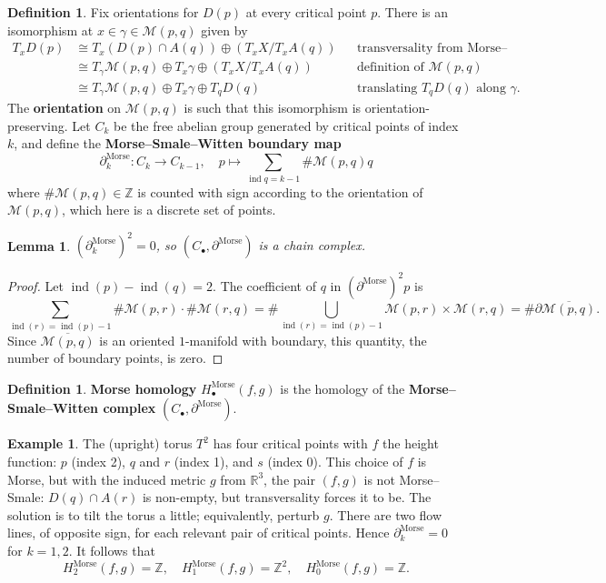 \documentclass{report}
\theoremstyle{plain}
\newtheorem{lemma}[theorem]{Lemma}
\theoremstyle{definition}
\newtheorem{definition}[theorem]{Definition}
\newtheorem{example}[theorem]{Example}
\theoremstyle{remark}
\newcommand{\di}{\partial}
\newcommand{\bR}{\mathbb{R}}
\newcommand{\bZ}{\mathbb{Z}}
\newcommand{\cM}{\mathcal{M}}
\newcommand{\Morse}{\mathrm{Morse}}
\DeclareMathOperator{\ind}{ind}
\begin{document}
\begin{definition}
  Fix orientations for $D(p)$ at every critical point $p$. There is an
  isomorphism at $x \in \gamma \in \cM(p, q)$ given by
  \begin{align*}
    T_xD(p) &\cong T_x(D(p) \cap A(q)) \oplus (T_xX/T_xA(q)) && \text{transversality from Morse--Smale} \\
    &\cong T_\gamma \cM(p, q) \oplus T_x\gamma \oplus (T_xX/T_xA(q)) && \text{definition of $\cM(p, q)$} \\
    &\cong T_\gamma \cM(p, q) \oplus T_x\gamma \oplus T_qD(q) && \text{translating $T_qD(q)$ along $\gamma$.}
  \end{align*}
  The {\bf orientation} on $\cM(p, q)$ is such that this isomorphism
  is orientation-preserving. Let $C_k$ be the free abelian group
  generated by critical points of index $k$, and define the {\bf
    Morse--Smale--Witten boundary map}
  \[ \di_k^{\Morse}\colon C_k \to C_{k-1}, \quad p \mapsto \sum_{\ind q = k-1} \# \cM(p, q) q \]
  where $\# \cM(p, q) \in \bZ$ is counted with sign according to the
  orientation of $\cM(p, q)$, which here is a discrete set of points.
\end{definition}

\begin{lemma}
  $(\di_k^\Morse)^2 = 0$, so $(C_\bullet, \di^\Morse)$ is a chain
  complex.
\end{lemma}

\begin{proof}
  Let $\ind(p) - \ind(q) = 2$. The coefficient of $q$ in
  $(\di^\Morse)^2p$ is
  \[ \sum_{\ind(r) = \ind(p)-1} \# \cM(p, r) \cdot \# \cM(r, q) = \# \bigcup_{\ind(r) = \ind(p)-1} \cM(p, r) \times \cM(r, q) = \# \di \overline{\cM(p, q)}. \]
  Since $\overline{\cM(p, q)}$ is an oriented $1$-manifold with
  boundary, this quantity, the number of boundary points, is
  zero.
\end{proof}

\begin{definition}
  {\bf Morse homology} $H_\bullet^\Morse(f, g)$ is the homology of the
  {\bf Morse--Smale--Witten complex} $(C_\bullet, \di^{\Morse})$.
\end{definition}

\begin{example}
  The (upright) torus $T^2$ has four critical points with $f$ the
  height function: $p$ (index 2), $q$ and $r$ (index 1), and $s$
  (index 0). This choice of $f$ is Morse, but with the induced metric
  $g$ from $\bR^3$, the pair $(f, g)$ is not Morse--Smale: $D(q) \cap
  A(r)$ is non-empty, but transversality forces it to be. The solution
  is to tilt the torus a little; equivalently, perturb $g$. There are
  two flow lines, of opposite sign, for each relevant pair of critical
  points. Hence $\di_k^\Morse = 0$ for $k = 1, 2$. It follows that
  \[ H_2^\Morse(f, g) = \bZ, \quad H_1^\Morse(f,g) = \bZ^2, \quad H_0^\Morse(f, g) = \bZ. \]
\end{example}
\end{document}
